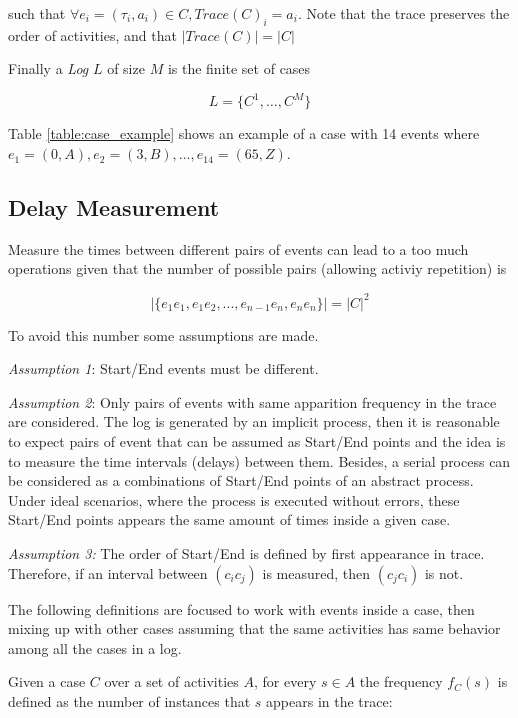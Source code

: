 \documentclass{article}
\begin{document}
such that $\forall e_i=(\tau_i, a_i) \in C, Trace(C)_i = a_i$. Note that the trace preserves the order of activities, and that $|Trace(C)| = |C|$

Finally a \emph{Log} $L$ of size $M$ is the finite set of cases 

\begin{equation}
    L = \{C^1, \dots, C^M\}
\end{equation}

Table \ref{table:case_example} shows an example of a case with 14 events where $e_1 = (0, A), e_2 = (3, B), ... , e_{14} = (65, Z)$.


\subsection{Delay Measurement}

Measure the times between different pairs of events can lead to a too much operations given that the number of possible pairs (allowing activiy repetition) is 

$$| \{ e_1e_1, e_1e_2, ... , e_{n-1}e_n, e_ne_n \} | = |C|^2$$

To avoid this number some assumptions are made.

\emph{Assumption 1}: Start/End events must be different. 

\emph{Assumption 2}: Only pairs of events with same apparition frequency in the trace are considered. The log is generated by an implicit process, then it is reasonable to expect pairs of event that can be assumed as Start/End points and the idea is to measure the time intervals (delays) between them. Besides, a serial process can be considered as a combinations of Start/End points of an abstract process. Under ideal scenarios, where the process is executed without errors, these Start/End points appears the same amount of times inside a given case. 

\emph{Assumption 3:} The order of Start/End is defined by first appearance in trace. Therefore, if an interval between $(c_ic_j)$ is measured, then $(c_jc_i)$ is not.

The following definitions are focused to work with events inside a case, then mixing up with other cases assuming that the same activities has same behavior among all the cases in a log.

Given a case $C$ over a set of activities $A$, for every $s \in A$ the frequency $f_C(s)$ is defined as the number of instances that $s$ appears in the trace:
\end{document}
